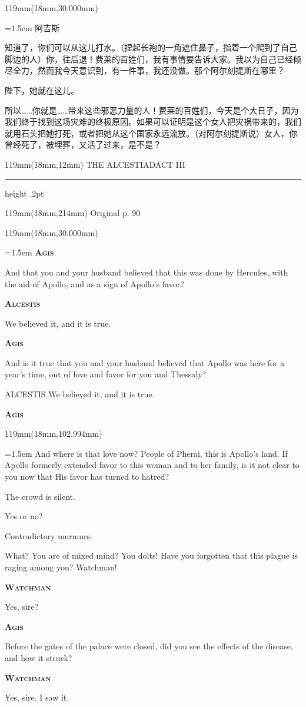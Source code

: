\documentclass{article}
\newcommand{\ENsetup}{\normalfont\color{ink}\fontsize{11}{16.5}\selectfont\emergencystretch=1.5em}
\newcommand{\ZHsetup}{\normalfont\color{ink}\fontsize{10.5}{17}\selectfont\emergencystretch=1.5em}
\newcommand{\ENspeaker}[1]{{\fontsize{9.8}{13}\selectfont\scshape\bfseries #1}\par\vspace{3pt}}
\newcommand{\ZHspeaker}[1]{{\hei\fontsize{10.3}{13}\selectfont #1}\par\vspace{3pt}}
\newcommand{\Block}[3]{\begin{textblock*}{119mm}(18mm,#1mm){#2 #3\par}\end{textblock*}}
\newcommand{\Heading}[3]{%
  \begin{textblock*}{119mm}(18mm,12mm)
    \color{quiet}\fontsize{7.5}{10}\selectfont
    #1\hfill #2\par\vspace{3mm}\hrule height .2pt
  \end{textblock*}
  \begin{textblock*}{119mm}(18mm,214mm)
    \color{quiet}\fontsize{7}{10}\selectfont #3\hfill\thepage
  \end{textblock*}
}
\begin{document}
\Block{30.000}{\ZHsetup}{\ZHspeaker{阿吉斯}知道了，你们可以从这儿打水。{\kai （捏起长袍的一角遮住鼻子，指着一个爬到了自己脚边的人）}你，往后退！费莱的百姓们，我有事情要告诉大家。我以为自己已经倾尽全力，然而我今天意识到，有一件事，我还没做。那个阿尔刻提斯在哪里？\par \vspace{2.2mm}\ZHspeaker{看门人}陛下，她就在这儿。\par \vspace{2.2mm}\ZHspeaker{阿吉斯}{\kai （转过身，轻蔑地看着她，慢慢说道）}所以……你就是……带来这些邪恶力量的人！费莱的百姓们，今天是个大日子，因为我们终于找到这场灾难的终极原因。如果可以证明是这个女人把灾祸带来的，我们就用石头把她打死，或者把她从这个国家永远流放。{\kai （对阿尔刻提斯说）}女人，你曾经死了，被埋葬，又活了过来，是不是？\par }
\newpage
\null
\Heading{THE ALCESTIAD}{ACT III}{Original p. 90}
\Block{30.000}{\ENsetup}{\sloppy
\ENspeaker{Agis}
And that you and your husband believed that this was done by Hercules, with the aid of Apollo, and as a sign of Apollo's favor?\par\vspace{2pt}
\ENspeaker{Alcestis}
We believed it, and it is true.\par\vspace{2pt}
\ENspeaker{Agis}
And is it true that you and your husband believed that Apollo was here for a year's time, out of love and favor for you and Thessaly?\par\vspace{2pt}
ALCESTIS We believed it, and it is true.\par\vspace{2pt}
\ENspeaker{Agis}}
\Block{102.994}{\ENsetup}{\sloppy
And where is that love now? People of Pherai, this is Apollo's land. If Apollo formerly extended favor to this woman and to her family, is it not clear to you now that His favor has turned to hatred?\par\vspace{2pt}
The crowd is silent.\par\vspace{2pt}
Yes or no?\par\vspace{2pt}
Contradictory murmurs.\par\vspace{2pt}
What? You are of mixed mind? You dolts! Have you forgotten that this plague is raging among you? Watchman!\par\vspace{2pt}
\ENspeaker{Watchman}
Yes, sire?\par\vspace{2pt}
\ENspeaker{Agis}
Before the gates of the palace were closed, did you see the effects of the disease, and how it struck?\par\vspace{2pt}
\ENspeaker{Watchman}
Yes, sire, I saw it.\par\vspace{2pt}}
\end{document}
